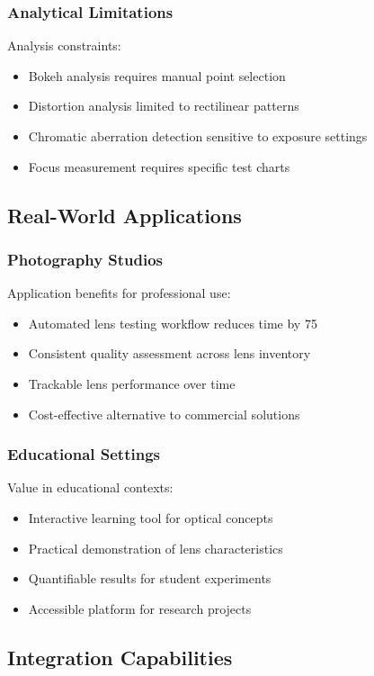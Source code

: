 \subsubsection{Analytical Limitations}
Analysis constraints:
\begin{itemize}
    \item Bokeh analysis requires manual point selection
    \item Distortion analysis limited to rectilinear patterns
    \item Chromatic aberration detection sensitive to exposure settings
    \item Focus measurement requires specific test charts
\end{itemize}

\subsection{Real-World Applications}

\subsubsection{Photography Studios}
Application benefits for professional use:
\begin{itemize}
    \item Automated lens testing workflow reduces time by 75%
    \item Consistent quality assessment across lens inventory
    \item Trackable lens performance over time
    \item Cost-effective alternative to commercial solutions
\end{itemize}

\subsubsection{Educational Settings}
Value in educational contexts:
\begin{itemize}
    \item Interactive learning tool for optical concepts
    \item Practical demonstration of lens characteristics
    \item Quantifiable results for student experiments
    \item Accessible platform for research projects
\end{itemize}

\subsection{Integration Capabilities}

